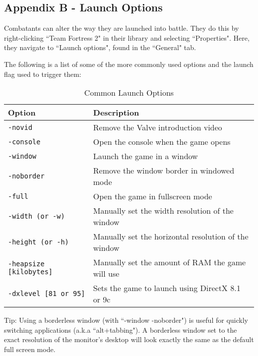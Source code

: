 \subsection{Appendix B - Launch Options}
Combatants can alter the way they are launched into battle. They do this by right-clicking ``Team Fortress 2" in their library and selecting ``Properties". Here, they navigate to ``Launch options", found in the ``General" tab.

The following is a list of some of the more commonly used options and the launch flag used to trigger them:

\begin{table}[h!b!p!]
\caption{Common Launch Options}
\begin{tabular}{|l|p{10.5cm}|}
	\hline
		Option & Description\\
	\hline
	\texttt{-novid}&Remove the Valve introduction video\\
	\texttt{-console}&Open the console when the game opens\\
	\texttt{-window}&Launch the game in a window\\
	\texttt{-noborder}&Remove the window border in windowed mode\\
	\texttt{-full}&Open the game in fullscreen mode\\
	\texttt{-width (or -w)}&Manually set the width resolution of the window\\
	\texttt{-height (or -h)}&Manually set the horizontal resolution of the window\\
	\texttt{-heapsize [kilobytes]}&Manually set the amount of RAM the game will use\\
	\texttt{-dxlevel [81 or 95]}&Sets the game to launch using DirectX 8.1 or 9c\\

  	\hline
\end{tabular}
\label{table_launch_options}
\end{table}

Tip: Using a borderless window (with ``-window -noborder") is useful for quickly switching applications (a.k.a ``alt+tabbing").  A borderless window set to the exact resolution of the monitor's desktop will look exactly the same as the default full screen mode.
